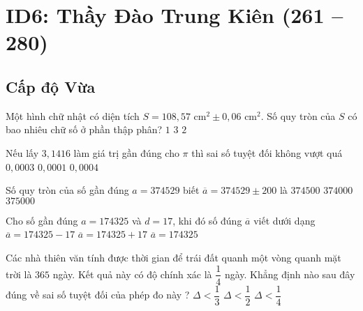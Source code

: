 \section*{ID6: Thầy Đào Trung Kiên (261 -- 280)}
\subsection*{Cấp độ Vừa}
\begin{ex}%
	Một hình chữ nhật có diện tích $S = 108, 57 \text{ cm}^2 \pm 0,06 \text{ cm}^2$. Số quy tròn của $S$ có bao nhiêu chữ số ở phần thập phân? 
	{\True $1$}
	{$3$}
	{$2$}
\end{ex}

\begin{ex}%
	Nếu lấy $3,1416$ làm giá trị gần đúng cho $\pi$ thì sai số tuyệt đối không vượt quá 
	{$0, 0003$}
	{\True $0, 0001$}
	{$0, 0004$}
\end{ex}

\begin{ex}%
	Số quy tròn của số gần đúng $a = 374 529$ biết $\overline{a} = 374 529 \pm 200$ là 
	{$374 500$}
	{$374 000$}
	{\True $375 000$}
\end{ex}

\begin{ex}%
	Cho số gần đúng $a= 174 325$  và $d = 17$, khi đó số đúng $\overline{a}$ viết dưới dạng  
	{$\overline{a} = 174 325 - 17$}
	{$\overline{a} = 174 325 + 17$}
	{$\overline{a} = 174 325$}
\end{ex}

\begin{ex}%
	Các nhà thiên văn tính được thời gian để trái đất quanh một vòng quanh mặt trời là $365$ ngày. Kết quả này có độ chính xác là $\dfrac{1}{4}$ ngày. Khẳng định nào sau đây đúng về sai số tuyệt đối của phép đo này ? 
	{$\Delta < \dfrac{1}{3}$}
	{$\Delta < \dfrac{1}{2}$}
	{\True $\Delta < \dfrac{1}{4}$}
\end{ex}

